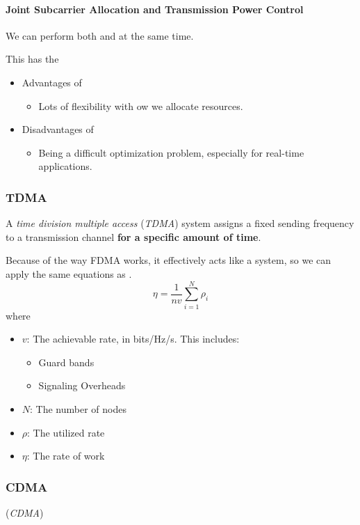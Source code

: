 \paragraph{Joint Subcarrier Allocation and Transmission Power Control}\label{par:Joint_Subcarrier_Transmission_Power}
We can perform both  and  at the same time.

This has the
\begin{itemize}[noitemsep]
\item Advantages of
  \begin{itemize}[noitemsep]
  \item Lots of flexibility with ow we allocate resources.
  \end{itemize}

\item Disadvantages of
  \begin{itemize}[noitemsep]
  \item Being a difficult optimization problem, especially for real-time applications.
  \end{itemize}
\end{itemize}

\subsubsection{TDMA}\label{subsubsec:TDMA}
\begin{definition}\label{def:TDMA}
  A \emph{time division multiple access}  (\emph{TDMA}) system assigns a fixed sending frequency to a transmission channel \textbf{for a specific amount of time}.

  Because of the way FDMA works, it effectively acts like a  system, so we can apply the same equations as .
  \begin{equation}\label{eq:TDMA_Work_Rate}
    \eta = \frac{1}{n v} \sum\limits_{i=1}^{N} \rho_{i}
  \end{equation}
  where
  \begin{itemize}[noitemsep]
  \item $v$: The achievable rate, in bits/Hz/s. This includes:
    \begin{itemize}[noitemsep]
    \item Guard bands
    \item Signaling Overheads
    \end{itemize}
  \item $N$: The number of nodes
  \item $\rho$: The utilized rate
  \item $\eta$: The rate of work
  \end{itemize}
\end{definition}


\subsubsection{CDMA}\label{subsubsec:CDMA}
\begin{definition}\label{def:CDMA}
   (\emph{CDMA})
\end{definition}

